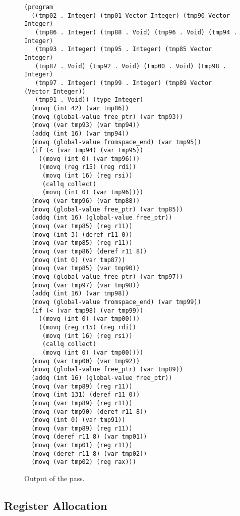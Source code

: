 \documentclass[11pt]{book}
\begin{document}
\begin{figure}[tbp]
\centering
\begin{minipage}{0.75\textwidth}
\begin{lstlisting}[basicstyle=\ttfamily\footnotesize]
(program
  ((tmp02 . Integer) (tmp01 Vector Integer) (tmp90 Vector Integer)
   (tmp86 . Integer) (tmp88 . Void) (tmp96 . Void) (tmp94 . Integer)
   (tmp93 . Integer) (tmp95 . Integer) (tmp85 Vector Integer)
   (tmp87 . Void) (tmp92 . Void) (tmp00 . Void) (tmp98 . Integer)
   (tmp97 . Integer) (tmp99 . Integer) (tmp89 Vector (Vector Integer))
   (tmp91 . Void)) (type Integer)
  (movq (int 42) (var tmp86))
  (movq (global-value free_ptr) (var tmp93))
  (movq (var tmp93) (var tmp94))
  (addq (int 16) (var tmp94))
  (movq (global-value fromspace_end) (var tmp95))
  (if (< (var tmp94) (var tmp95))
    ((movq (int 0) (var tmp96)))
    ((movq (reg r15) (reg rdi))
     (movq (int 16) (reg rsi))
     (callq collect)
     (movq (int 0) (var tmp96))))
  (movq (var tmp96) (var tmp88))
  (movq (global-value free_ptr) (var tmp85))
  (addq (int 16) (global-value free_ptr))
  (movq (var tmp85) (reg r11))
  (movq (int 3) (deref r11 0))
  (movq (var tmp85) (reg r11))
  (movq (var tmp86) (deref r11 8))
  (movq (int 0) (var tmp87))
  (movq (var tmp85) (var tmp90))
  (movq (global-value free_ptr) (var tmp97))
  (movq (var tmp97) (var tmp98))
  (addq (int 16) (var tmp98))
  (movq (global-value fromspace_end) (var tmp99))
  (if (< (var tmp98) (var tmp99))
    ((movq (int 0) (var tmp00)))
    ((movq (reg r15) (reg rdi))
     (movq (int 16) (reg rsi))
     (callq collect)
     (movq (int 0) (var tmp00))))
  (movq (var tmp00) (var tmp92))
  (movq (global-value free_ptr) (var tmp89))
  (addq (int 16) (global-value free_ptr))
  (movq (var tmp89) (reg r11))
  (movq (int 131) (deref r11 0))
  (movq (var tmp89) (reg r11))
  (movq (var tmp90) (deref r11 8))
  (movq (int 0) (var tmp91))
  (movq (var tmp89) (reg r11))
  (movq (deref r11 8) (var tmp01))
  (movq (var tmp01) (reg r11))
  (movq (deref r11 8) (var tmp02))
  (movq (var tmp02) (reg rax)))
\end{lstlisting}
\end{minipage}
\caption{Output of the  pass.}
\label{fig:select-instr-output-gc}
\end{figure}

\clearpage

\subsection{Register Allocation}
\label{sec:reg-alloc-gc}
\end{document}

